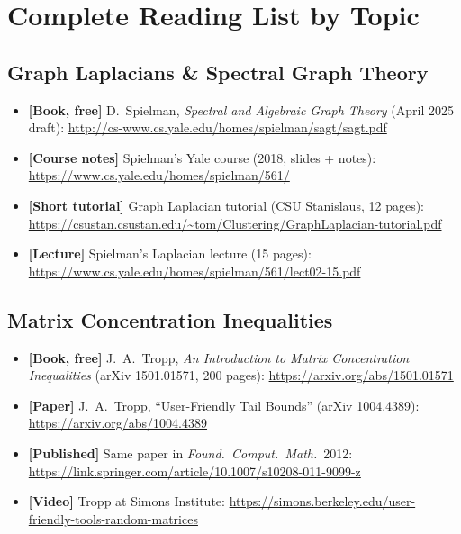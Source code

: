\documentclass[12pt]{article}
\theoremstyle{definition}
\theoremstyle{remark}
\begin{document}
\section*{Complete Reading List by Topic}

\subsection*{Graph Laplacians \& Spectral Graph Theory}

\begin{itemize}
  \item \textbf{[Book, free]} D.~Spielman, \emph{Spectral and Algebraic Graph Theory} (April 2025 draft):
        \url{http://cs-www.cs.yale.edu/homes/spielman/sagt/sagt.pdf}
  \item \textbf{[Course notes]} Spielman's Yale course (2018, slides + notes):
        \url{https://www.cs.yale.edu/homes/spielman/561/}
  \item \textbf{[Short tutorial]} Graph Laplacian tutorial (CSU Stanislaus, 12 pages):
        \url{https://csustan.csustan.edu/~tom/Clustering/GraphLaplacian-tutorial.pdf}
  \item \textbf{[Lecture]} Spielman's Laplacian lecture (15 pages):
        \url{https://www.cs.yale.edu/homes/spielman/561/lect02-15.pdf}
\end{itemize}

\subsection*{Matrix Concentration Inequalities}

\begin{itemize}
  \item \textbf{[Book, free]} J.~A.~Tropp, \emph{An Introduction to Matrix Concentration Inequalities}
        (arXiv 1501.01571, 200 pages):
        \url{https://arxiv.org/abs/1501.01571}
  \item \textbf{[Paper]} J.~A.~Tropp, ``User-Friendly Tail Bounds'' (arXiv 1004.4389):
        \url{https://arxiv.org/abs/1004.4389}
  \item \textbf{[Published]} Same paper in \emph{Found.\ Comput.\ Math.}\ 2012:
        \url{https://link.springer.com/article/10.1007/s10208-011-9099-z}
  \item \textbf{[Video]} Tropp at Simons Institute:
        \url{https://simons.berkeley.edu/user-friendly-tools-random-matrices}
\end{itemize}
\end{document}
